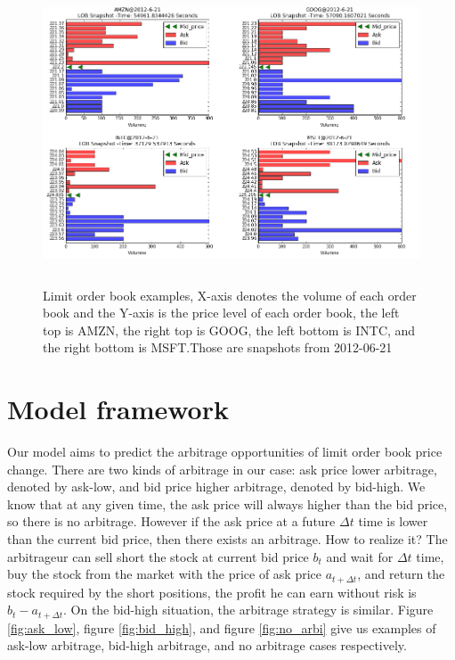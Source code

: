 \begin{figure} [hp]
  \begin{center}
    \includegraphics[width=4.5in,  height=3.5in]{figures/snapshot.png}
  \end{center}
\caption{Limit order book examples,   X-axis denotes the volume of each order book and the Y-axis is the price level of each order book,  the left top is AMZN,   the right top is GOOG,   the left bottom is INTC,   and the right bottom is MSFT.Those are snapshots from 2012-06-21} \label{fig:order_snapshot}
\end{figure}

\section{Model framework}
Our model aims to predict the arbitrage opportunities of limit order book price change. There are two kinds of arbitrage in our case: ask price lower arbitrage, denoted by ask-low, and bid price higher arbitrage, denoted by bid-high. We know that at any given time,   the ask price will always higher than the bid price,   so there is no arbitrage. However if the ask price at a future $\Delta t$ time is lower than the current bid price,   then there exists an arbitrage. How to realize it? The arbitrageur can sell short the stock at current bid price $b_t $ and wait for $\Delta t$ time,   buy the stock from the market with the price of ask price $a_{t+\Delta t}$,   and  return the stock required by the short positions,   the profit he can earn without risk is $b_t-a_{t+\Delta t}$. On the bid-high situation,   the arbitrage strategy is similar. Figure \ref{fig:ask_low},   figure \ref{fig:bid_high},   and figure \ref{fig:no_arbi} give us examples of ask-low arbitrage,   bid-high arbitrage,   and no arbitrage cases respectively.

